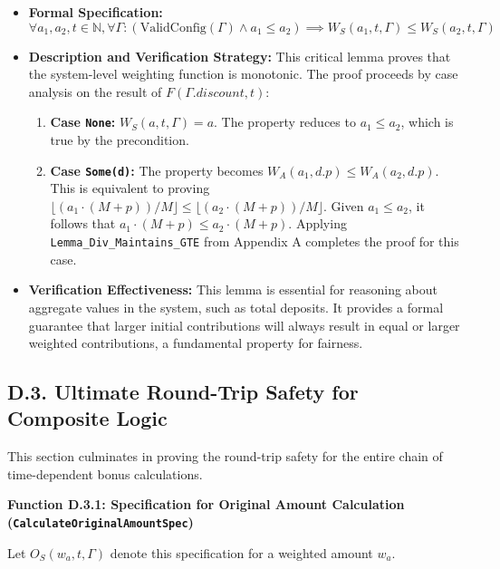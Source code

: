 \documentclass[
  english,
  onecolumn]{article}
\providecommand{\tightlist}{%
  \setlength{\itemsep}{0pt}\setlength{\parskip}{0pt}}
\begin{document}
\begin{itemize}
\tightlist
\item
  \textbf{Formal Specification:} \[
  \forall a_1, a_2, t \in \mathbb{N}, \forall \Gamma : (\text{ValidConfig}(\Gamma) \land a_1 \le a_2) \implies W_S(a_1, t, \Gamma) \le W_S(a_2, t, \Gamma)
  \]
\item
  \textbf{Description and Verification Strategy:} This critical lemma
  proves that the system-level weighting function is monotonic. The
  proof proceeds by case analysis on the result of
  \(F(\Gamma.discount, t)\):

  \begin{enumerate}
  \def\labelenumi{\arabic{enumi}.}
  \tightlist
  \item
    \textbf{Case \texttt{None}:} \(W_S(a, t, \Gamma) = a\). The property
    reduces to \(a_1 \le a_2\), which is true by the precondition.
  \item
    \textbf{Case \texttt{Some(d)}:} The property becomes
    \(W_A(a_1, d.p) \le W_A(a_2, d.p)\). This is equivalent to proving
    \(\lfloor(a_1 \cdot (M+p))/M\rfloor \le \lfloor(a_2 \cdot (M+p))/M\rfloor\).
    Given \(a_1 \le a_2\), it follows that
    \(a_1 \cdot (M+p) \le a_2 \cdot (M+p)\). Applying
    \texttt{Lemma\_Div\_Maintains\_GTE} from Appendix A completes the
    proof for this case.
  \end{enumerate}
\item
  \textbf{Verification Effectiveness:} This lemma is essential for
  reasoning about aggregate values in the system, such as total
  deposits. It provides a formal guarantee that larger initial
  contributions will always result in equal or larger weighted
  contributions, a fundamental property for fairness.
\end{itemize}

\subsection{D.3. Ultimate Round-Trip Safety for Composite
Logic}\label{d.3.-ultimate-round-trip-safety-for-composite-logic}

This section culminates in proving the round-trip safety for the entire
chain of time-dependent bonus calculations.

\textbf{Function D.3.1: Specification for Original Amount Calculation
(\texttt{CalculateOriginalAmountSpec})}

Let \(O_S(w_a, t, \Gamma)\) denote this specification for a weighted
amount \(w_a\).
\end{document}
